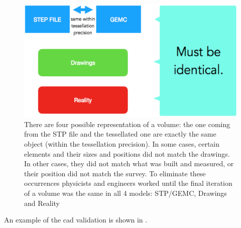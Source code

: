 \begin{figure}
	\centering
	\includegraphics[width=0.95\columnwidth,keepaspectratio]{img/cadValidation.png}
	\caption{There are four possible representation of a volume: the one coming from the STP file
             and the tessellated one are exactly the same object (within the tessellation precision).
             In some cases, certain elements and their sizes and positions did not match the drawings.
             In other cases, they did not match what was built and measured, or their position did not
             match the survey. To eliminate these occurrences physicists and engineers worked until
             the final iteration of a volume was the same in all 4 models: STP/GEMC, Drawings and Reality}
	\label{fig:cadValidation}
\end{figure}

An example of the cad validation is shown in .

